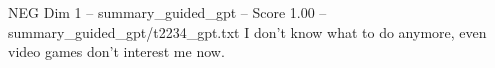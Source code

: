 \begin{textsample}{NEG Dim 1 – summary\_guided\_gpt – Score 1.00 – summary\_guided\_gpt/t2234\_gpt.txt}  \label{ex:f1_neg_024}
I don't know what to do anymore, even video games don't interest me now.

\end{textsample}
